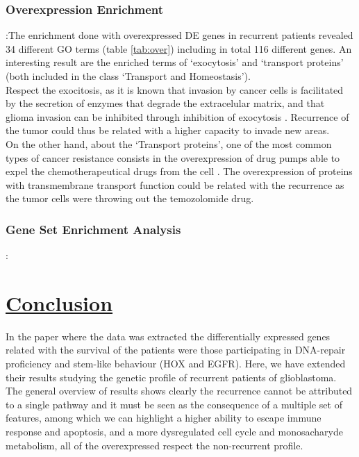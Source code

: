 \documentclass[9pt,twocolumn,twoside]{gsajnl}
\begin{document}
\subsubsection*{Overexpression Enrichment}:The enrichment done with overexpressed DE genes in recurrent patients revealed 34 different GO terms (table \ref{tab:over}) including in total 116 different genes. An interesting result are the enriched terms of `exocytosis' and `transport proteins' (both included in the class `Transport and Homeostasis').\\
Respect the exocitosis, as it is known that invasion by cancer cells is facilitated by the secretion of enzymes that degrade the extracelular matrix, and that glioma invasion can be inhibited through inhibition of exocytosis \citep{Liu2012}. Recurrence of the tumor could thus be related with a higher capacity to invade new areas.\\
On the other hand, about the `Transport proteins', one of the most common types of cancer resistance consists in the overexpression of drug pumps able to expel the chemotherapeutical drugs from the cell \citep{Borst2012}. The overexpression of proteins with transmembrane transport function could be related with the recurrence as the tumor cells were throwing out the temozolomide drug.

\subsubsection*{Gene Set Enrichment Analysis}:


\section*{\underline{Conclusion}}
In the paper where the data was extracted \citep{Murat2008} the differentially expressed genes related with the survival of the patients were those participating in DNA-repair proficiency and stem-like behaviour (HOX and EGFR). Here, we have extended their results studying the genetic profile of recurrent patients of glioblastoma. The general overview of results shows clearly the recurrence cannot be attributed to a single pathway and it must be seen as the consequence of a multiple set of features, among which we can highlight a higher ability to escape immune response and apoptosis, and a more dysregulated cell cycle and monosacharyde metabolism, all of the overexpressed respect the non-recurrent profile.
\end{document}
